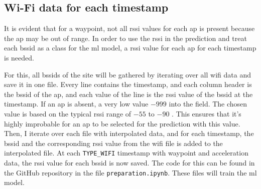 \subsection{Wi-Fi data for each timestamp}\label{sec:wifi-data}
It is evident that for a waypoint, not all \ac{rssi} values for each \ac{ap} is present because the \ac{ap} may be out of range.
In order to use the \ac{rssi} in the prediction and treat each \ac{bssid} as a class for the \ac{ml} model, a \ac{rssi} value for each \ac{ap} for each timestamp is needed.

For this, all \acp{bssid} of the site will be gathered by iterating over all \ac{wifi} data and save it in one file.
Every line contains the timestamp, and each column header is the \ac{bssid} of the \ac{ap}, and each value of the line is the \ac{rssi} value of the \ac{bssid} at the timestamp.
If an \ac{ap} is absent, a very low value \(-999\) into the field.
The chosen value is based on the typical \ac{rssi} range of \(-55\) to \(-90\) \cite{rssi_calculation}.
This ensures that it's highly improbable for an \ac{ap} to be selected for the prediction with this value.
Then, I iterate over each file with interpolated data, and for each timestamp, the \ac{bssid} and the corresponding \ac{rssi} value from the \ac{wifi} file is added to the interpolated file.
At each \texttt{TYPE\_WIFI} timestamp with waypoint and acceleration data, the \ac{rssi} value for each \ac{bssid} is now saved.
The code for this can be found in the GitHub repository \cite{github-repo} in the file \texttt{preparation.ipynb}.
These files will train the \ac{ml} model.

